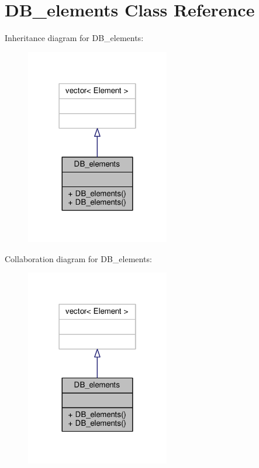 \hypertarget{class_d_b__elements}{}\section{D\+B\+\_\+elements Class Reference}
\label{class_d_b__elements}


Inheritance diagram for D\+B\+\_\+elements\+:\nopagebreak
\begin{figure}[H]
\begin{center}
\leavevmode
\includegraphics[width=178pt]{class_d_b__elements__inherit__graph}
\end{center}
\end{figure}


Collaboration diagram for D\+B\+\_\+elements\+:\nopagebreak
\begin{figure}[H]
\begin{center}
\leavevmode
\includegraphics[width=178pt]{class_d_b__elements__coll__graph}
\end{center}
\end{figure}
